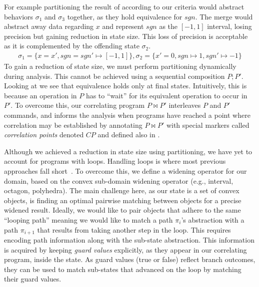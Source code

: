 For example partitioning the result of  according to our criteria would abstract behaviors $\sigma_1$ and $\sigma_3$ together, as they hold equivalence for $sgn$. The merge would abstract away data regarding $x$ and represent $sgn$ as the $[-1,1]$ interval, losing precision but gaining reduction in state size. This loss of precision is acceptable as it is complemented by the offending state $\sigma_2$.
{\footnotesize
\[
\begin{array}{c}
\sigma_1 = \{x = x', sgn = sgn' \mapsto [-1,1]\} ,
\sigma_2 = \{x' = 0, sgn \mapsto 1, sgn' \mapsto -1\}
\end{array}
\]
}
To gain a reduction of state size, we must perform partitioning dynamically during analysis. This cannot be achieved using a sequential composition $P;P'$. Looking at  we see that equivalence holds only at final states. Intuitively, this is because an operation in $P$ has to ``wait'' for its equivalent operation to occur in $P'$. To overcome this, our correlating program $P \bowtie P'$ interleaves $P$ and $P'$ commands, and informs the analysis when programs have reached a point where correlation may be established by annotating $P \bowtie P'$ with special markers called \emph{correlation points} denoted $CP$ and defined also in .


 Although we achieved a reduction in state size using partitioning, we have yet to account for programs with loops. Handling loops is where most previous approaches fall short~\cite{GodlinStrichman09,KawaguchiLahiriRebelo10,DwyerElbaumPerson08,EnglerRamos11}. To overcome this, we define a widening operator for our domain, based on the convex sub-domain widening operator (e.g., interval, octagon, polyhedra). The main challenge here, as our state is a set of convex objects, is finding an optimal pairwise matching between objects for a precise widened result. Ideally, we would like to pair objects that adhere to the same ``looping path'' meaning we would like to match a path $\pi_i$'s abstraction with a path $\pi_{i+1}$ that results from taking another step in the loop. This requires encoding path information along with the sub-state abstraction. This information is acquired by keeping \emph{guard values} explicitly, as they appear in our correlating program, inside the state. As guard values (true or false) reflect branch outcomes, they can be used to match sub-states that advanced on the loop by matching their guard values.

